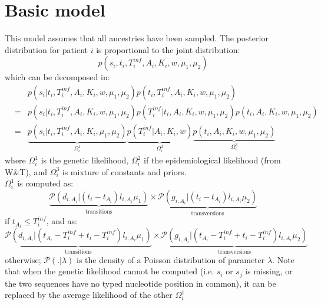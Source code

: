 \documentclass[10pt]{article}
\begin{document}
\section*{Basic model}
This model assumes that all ancestries have been sampled.
The posterior distribution for patient $i$ is proportional to the joint distribution:
\begin{equation}
 p(s_i, t_i, T_i^{inf}, A_i, K_i, w, \mu_1, \mu_2)
\end{equation}
which can be decomposed in:
\begin{eqnarray}
& & p(s_i | t_i, T_i^{inf}, A_i, K_i, w, \mu_1, \mu_2)  p(t_i, T_i^{inf}, A_i, K_i, w, \mu_1, \mu_2)\\
&=& p(s_i | t_i, T_i^{inf}, A_i, K_i, w, \mu_1, \mu_2)  p(T_i^{inf} | t_i, A_i, K_i, w, \mu_1, \mu_2) p(t_i, A_i, K_i, w, \mu_1, \mu_2)\\
&=& \underbrace{p(s_i | t_i, T_i^{inf}, A_i, K_i, \mu_1, \mu_2)}_{\Omega_i^1}  
    \underbrace{p(T_i^{inf} | A_i, K_i, w)}_{\Omega_i^2}
    \underbrace{p(t_i, A_i, K_i, w, \mu_1, \mu_2)}_{\Omega_i^3} 
\end{eqnarray}
\noindent where $\Omega_i^1$ is the genetic likelihood, $\Omega_i^2$ if the epidemiological likelihood (from W\&T), and $\Omega_i^3$ is mixture of constants and priors.
\\




$\Omega_i^1$ is computed as: 
$$
\underbrace{\mathcal{P}\left(d_{i,A_i} | (t_i - t_{A_i}) l_{i,A_i} \mu_1 \right)}_{\mbox{transitions}}
\times 
\underbrace{\mathcal{P}\left(g_{i,A_i} | (t_i - t_{A_i}) l_{i,A_i} \mu_2 \right)}_{\mbox{transversions}}
$$
if $t_{A_i} \leq T_i^{inf} $, and as:
$$
\underbrace{\mathcal{P}\left(d_{i,A_i} | (t_{A_i} - T_i^{inf} + t_i - T_i^{inf}) l_{i,A_i} \mu_1 \right)}_{\mbox{transitions}}
\times 
\underbrace{\mathcal{P}\left(g_{i,A_i} | (t_{A_i} - T_i^{inf} + t_i - T_i^{inf}) l_{i,A_i} \mu_2 \right)}_{\mbox{transversions}}
$$
otherwise; $\mathcal{P}(. | \lambda)$ is the density of a Poisson distribution of parameter $\lambda$.
Note that when the genetic likelihood cannot be computed (i.e. $s_i$ or $s_j$ is missing, or the two sequences have no typed nucleotide position in common), it can be replaced by the average likelihood of the other $\Omega_i^{1}$
~\\

\end{document}
